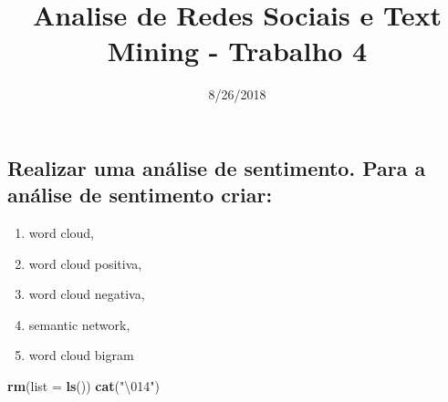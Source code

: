 \documentclass[]{article}
\title{Analise de Redes Sociais e Text Mining - Trabalho 4}
\author{}
\date{8/26/2018}
\newenvironment{Shaded}{\begin{snugshade}}{\end{snugshade}}
\newcommand{\CharTok}[1]{\textcolor[rgb]{0.31,0.60,0.02}{#1}}
\newcommand{\DataTypeTok}[1]{\textcolor[rgb]{0.13,0.29,0.53}{#1}}
\newcommand{\KeywordTok}[1]{\textcolor[rgb]{0.13,0.29,0.53}{\textbf{#1}}}
\newcommand{\NormalTok}[1]{#1}
\newcommand{\StringTok}[1]{\textcolor[rgb]{0.31,0.60,0.02}{#1}}
\providecommand{\tightlist}{%
  \setlength{\itemsep}{0pt}\setlength{\parskip}{0pt}}
\begin{document}
\maketitle

\hypertarget{realizar-uma-analise-de-sentimento.-para-a-analise-de-sentimento-criar}{%
\subsection{Realizar uma análise de sentimento. Para a análise de
sentimento
criar:}\label{realizar-uma-analise-de-sentimento.-para-a-analise-de-sentimento-criar}}

\begin{enumerate}
\def\labelenumi{\alph{enumi}.}
\tightlist
\item
  word cloud,
\item
  word cloud positiva,
\item
  word cloud negativa,
\item
  semantic network,
\item
  word cloud bigram
\end{enumerate}

\begin{Shaded}
\begin{Highlighting}[]
\KeywordTok{rm}\NormalTok{(}\DataTypeTok{list =} \KeywordTok{ls}\NormalTok{())}
\KeywordTok{cat}\NormalTok{(}\StringTok{"}\CharTok{\textbackslash{}014}\StringTok{"}\NormalTok{)}
\end{Highlighting}
\end{Shaded}


\end{document}
